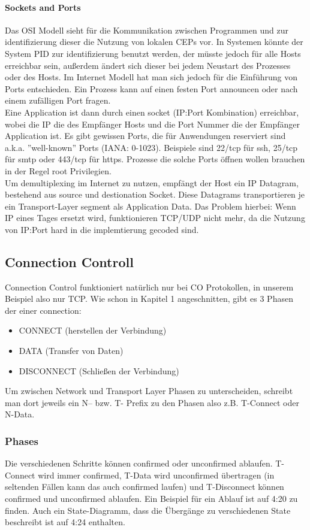 		\paragraph{Sockets and Ports} 
			Das OSI Modell sieht für die Kommunikation zwischen Programmen und zur identifizierung dieser die Nutzung von lokalen CEPs vor. In Systemen könnte der System PID zur identifizierung benutzt werden, der müsste jedoch für alle Hosts erreichbar sein, außerdem ändert sich dieser bei jedem Neustart des Prozesses oder des Hosts. Im Internet Modell hat man sich jedoch für die Einführung von Ports entschieden. Ein Prozess kann auf einen festen Port announcen oder nach einem zufälligen Port fragen. \\
			Eine Application ist dann durch einen socket (IP:Port Kombination) erreichbar, wobei die IP die des Empfänger Hosts und die Port Nummer die der Empfänger Application ist. Es gibt gewissen Ports, die für Anwendungen reserviert sind a.k.a. ''well-known'' Ports (IANA: 0-1023). Beispiele sind 22/tcp für ssh, 25/tcp für smtp oder 443/tcp für https. Prozesse die solche Ports öffnen wollen brauchen in der Regel root Privilegien. \\ 
			Um demultiplexing im Internet zu nutzen, empfängt der Host ein IP Datagram, bestehend aus source und destionation Socket. Diese Datagrams transportieren je ein Transport-Layer segment als Application Data. Das Problem hierbei: Wenn IP eines Tages ersetzt wird, funktionieren TCP/UDP nicht mehr, da die Nutzung von IP:Port hard in die implemtierung gecoded sind. 
	
	\subsection{Connection Controll}
		Connection Control funktioniert natürlich nur bei CO Protokollen, in unserem Beispiel also nur TCP. Wie schon in Kapitel 1 angeschnitten, gibt es 3 Phasen der einer connection:
		\begin{itemize}
			\item CONNECT (herstellen der Verbindung)
			\item DATA (Transfer von Daten)
			\item DISCONNECT (Schließen der Verbindung)
		\end{itemize}
		Um zwischen Network und Transport Layer Phasen zu unterscheiden, schreibt man dort jeweils ein N-- bzw. T- Prefix zu den Phasen also z.B. T-Connect oder N-Data.

		\subsubsection{Phases}  
			Die verschiedenen Schritte können confirmed oder unconfirmed ablaufen. T-Connect wird immer confirmed, T-Data wird unconfirmed übertragen (in seltenden Fällen kann das auch confirmed laufen) und T-Disconnect können confirmed und unconfirmed ablaufen. Ein Beispiel für ein Ablauf ist auf 4:20 zu finden. Auch ein State-Diagramm, dass die Übergänge zu verschiedenen State beschreibt ist auf 4:24 enthalten.

